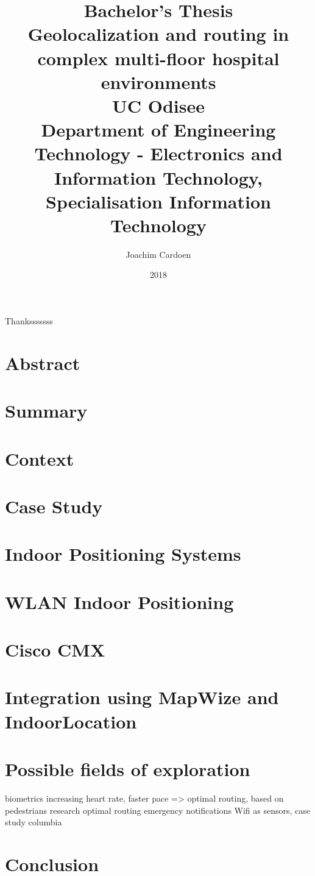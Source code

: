 \documentclass[11pt,twoside]{report}
\title{
    {\large Bachelor's Thesis}\\
    {Geolocalization and routing in complex multi-floor hospital environments}\\
    {\large UC Odisee}\\
    {\large Department of Engineering Technology - Electronics and Information Technology, Specialisation Information Technology}
}
\author{Joachim Cardoen}
\date{2018}
\begin{document}
\begin{titlepage}
\maketitle
\end{titlepage}
\begin{center}
Thanksssssss
\end{center}
\chapter*{Abstract}
\tableofcontents
\clearpage
\printglossary[type=\acronymtype]
\printglossary
\clearpage
\listoffigures
\clearpage
\listoftables
\chapter{Summary}
\chapter{Context}

\chapter{Case Study}

\chapter{Indoor Positioning Systems}

\chapter{WLAN Indoor Positioning}

\chapter{Cisco CMX}

\chapter{Integration using MapWize and IndoorLocation}

\chapter{Possible fields of exploration}
biometrics
increasing heart rate, faster pace => optimal routing, based on pedestrians research
optimal routing
emergency notifications
Wifi as sensors, case study columbia
\chapter{Conclusion}


\newpage
\printbibliography
\end{document}
